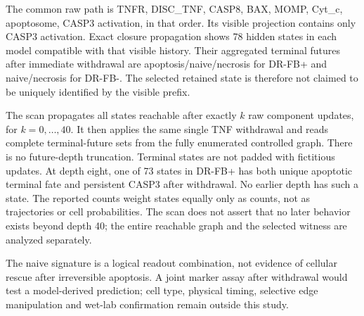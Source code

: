 \documentclass{ws-jbcb}
\numberwithin{equation}{section}
\begin{document}
The common raw path is TNFR, DISC\_TNF, CASP8, BAX, MOMP, Cyt\_c,
apoptosome, CASP3 activation, in that order. Its visible projection contains
only CASP3 activation. Exact closure propagation shows 78 hidden states in
each model compatible with that visible history. Their aggregated terminal
futures after immediate withdrawal are apoptosis/naive/necrosis for DR-FB+
and naive/necrosis for DR-FB-. The selected retained state is therefore not
claimed to be uniquely identified by the visible prefix.

The scan propagates all states reachable after exactly $k$ raw component
updates, for $k=0,\ldots,40$. It then applies the same single TNF withdrawal
and reads complete terminal-future sets from the fully enumerated controlled
graph. There is no future-depth truncation. Terminal states are not padded
with fictitious updates. At depth eight, one of 73 states in DR-FB+ has both
unique apoptotic terminal fate and persistent CASP3 after withdrawal. No
earlier depth has such a state. The reported counts weight states equally
only as counts, not as trajectories or cell probabilities. The scan does not
assert that no later behavior exists beyond depth 40; the entire reachable
graph and the selected witness are analyzed separately.

The naive signature is a logical readout combination, not evidence of cellular
rescue after irreversible apoptosis. A joint marker assay after withdrawal
would test a model-derived prediction; cell type, physical timing, selective
edge manipulation and wet-lab confirmation remain outside this study.
\end{document}
